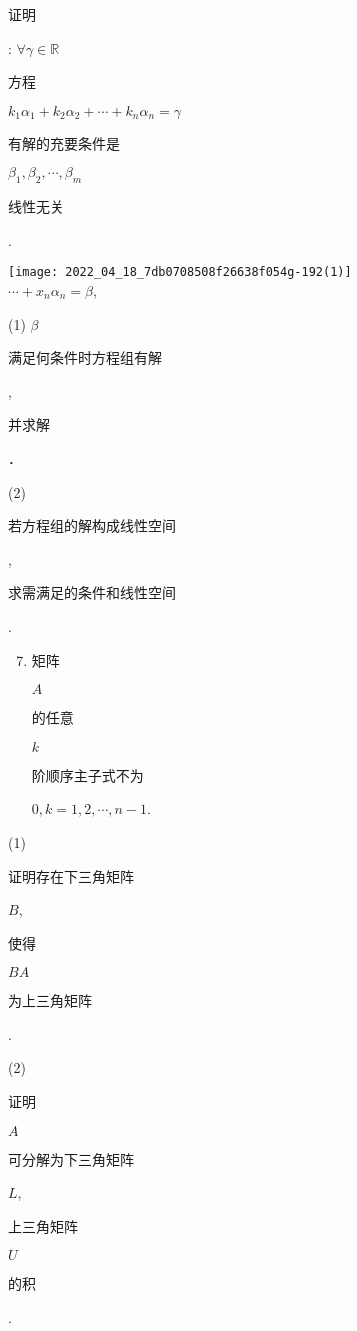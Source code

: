 \documentclass[10pt]{article}
\begin{document}
\begin{CJK}{UTF8}{mj}证明\end{CJK}: $\forall \gamma \in \mathbb{R}$ \begin{CJK}{UTF8}{mj}方程\end{CJK} $k_{1} \alpha_{1}+k_{2} \alpha_{2}+\cdots+k_{n} \alpha_{n}=\gamma$ \begin{CJK}{UTF8}{mj}有解的充要条件是\end{CJK} $\beta_{1}, \beta_{2}, \cdots, \beta_{m}$ \begin{CJK}{UTF8}{mj}线性无关\end{CJK}.

\texttt{[image: 2022\_04\_18\_7db0708508f26638f054g-192(1)]}\\
$\cdots+x_{n} \alpha_{n}=\beta$,

(1) $\beta$ \begin{CJK}{UTF8}{mj}满足何条件时方程组有解\end{CJK}, \begin{CJK}{UTF8}{mj}并求解\end{CJK}．

(2) \begin{CJK}{UTF8}{mj}若方程组的解构成线性空间\end{CJK}, \begin{CJK}{UTF8}{mj}求需满足的条件和线性空间\end{CJK}.

\begin{enumerate}
  \setcounter{enumi}{6}
  \item \begin{CJK}{UTF8}{mj}矩阵\end{CJK} $A$ \begin{CJK}{UTF8}{mj}的任意\end{CJK} $k$ \begin{CJK}{UTF8}{mj}阶顺序主子式不为\end{CJK} $0, k=1,2, \cdots, n-1$.
\end{enumerate}
(1) \begin{CJK}{UTF8}{mj}证明存在下三角矩阵\end{CJK} $B$, \begin{CJK}{UTF8}{mj}使得\end{CJK} $B A$ \begin{CJK}{UTF8}{mj}为上三角矩阵\end{CJK}.

(2) \begin{CJK}{UTF8}{mj}证明\end{CJK} $A$ \begin{CJK}{UTF8}{mj}可分解为下三角矩阵\end{CJK} $L$, \begin{CJK}{UTF8}{mj}上三角矩阵\end{CJK} $U$ \begin{CJK}{UTF8}{mj}的积\end{CJK}.
\end{document}
